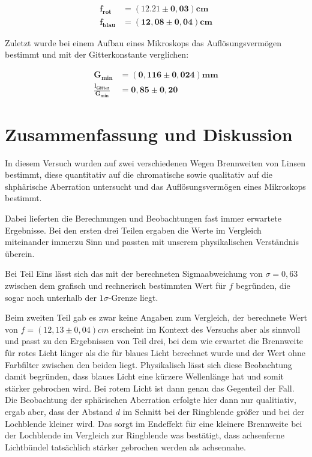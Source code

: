 \documentclass{article}
\begin{document}
\begin{equation}
    \begin{split}
        \bm{f_{rot}} &= \bm{(12.21 \pm 0,03)cm} \\
        \bm{f_{blau}} &= \bm{(12,08 \pm 0,04)cm}
    \end{split}
\end{equation}

Zuletzt wurde bei einem Aufbau eines Mikroskops das Auflösungsvermögen bestimmt und mit der Gitterkonstante verglichen:

\begin{equation}
\begin{split}
    \bm{G_{min}} &= \bm{(0,116 \pm 0,024)mm} \\
    \bm{\frac{l_{Gitter}}{G_{min}}} &= \bm{0,85 \pm 0,20}
\end{split}
\end{equation}

\newpage

\section{Zusammenfassung und Diskussion}

In diesem Versuch wurden auf zwei verschiedenen Wegen Brennweiten von Linsen bestimmt, diese quantitativ auf die chromatische sowie qualitativ auf die shphärische Aberration untersucht und das Auflösungsvermögen eines Mikroskops bestimmt. 

Dabei lieferten die Berechnungen und Beobachtungen fast immer erwartete Ergebnisse. Bei den ersten drei Teilen ergaben die Werte im Vergleich miteinander immerzu Sinn und passten mit unserem physikalischen Verständnis überein. 

Bei Teil Eins lässt sich das mit der berechneten Sigmaabweichung von $\sigma = 0,63$ zwischen dem grafisch und rechnerisch bestimmten Wert für $f$ begründen, die sogar noch unterhalb der $1\sigma$-Grenze liegt. 

Beim zweiten Teil gab es zwar keine Angaben zum Vergleich, der berechnete Wert von $f = (12,13 \pm 0,04)cm$ erscheint im Kontext des Versuchs aber als sinnvoll und passt zu den Ergebnissen von Teil drei, bei dem wie erwartet die Brennweite für rotes Licht länger als die für blaues Licht berechnet wurde und der Wert ohne Farbfilter zwischen den beiden liegt. Physikalisch lässt sich diese Beobachtung damit begründen, dass blaues Licht eine kürzere Wellenlänge hat und somit stärker gebrochen wird. Bei rotem Licht ist dann genau das Gegenteil der Fall. \\
Die Beobachtung der sphärischen Aberration erfolgte hier dann nur qualitiativ, ergab aber, dass der Abstand $d$ im Schnitt bei der Ringblende größer und bei der Lochblende kleiner wird. Das sorgt im Endeffekt für eine kleinere Brennweite bei der Lochblende im Vergleich zur Ringblende was bestätigt, dass achsenferne Lichtbündel tatsächlich stärker gebrochen werden als achsennahe. 
\end{document}
